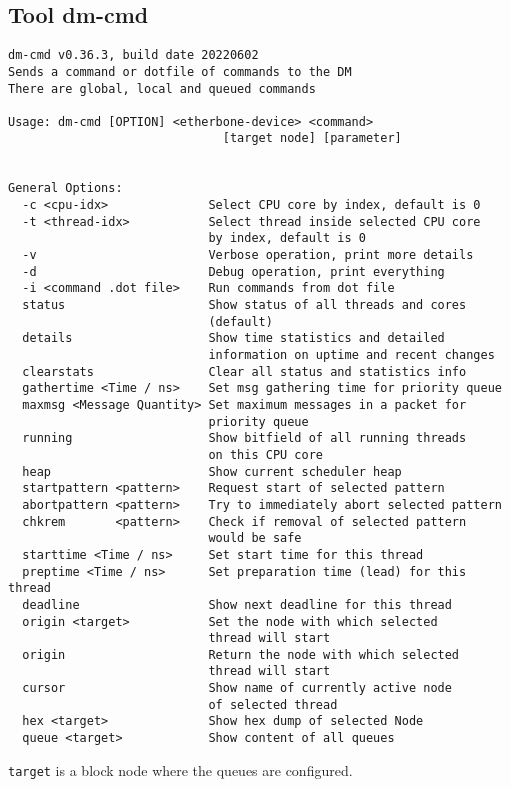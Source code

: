 \subsection{Tool dm-cmd}
\label{Tool_dm-cmd}
\begin{lstlisting}[style = helptext]
dm-cmd v0.36.3, build date 20220602
Sends a command or dotfile of commands to the DM
There are global, local and queued commands

Usage: dm-cmd [OPTION] <etherbone-device> <command>
                              [target node] [parameter]


General Options:
  -c <cpu-idx>              Select CPU core by index, default is 0
  -t <thread-idx>           Select thread inside selected CPU core
                            by index, default is 0
  -v                        Verbose operation, print more details
  -d                        Debug operation, print everything
  -i <command .dot file>    Run commands from dot file
  status                    Show status of all threads and cores
                            (default)
  details                   Show time statistics and detailed
                            information on uptime and recent changes
  clearstats                Clear all status and statistics info
  gathertime <Time / ns>    Set msg gathering time for priority queue
  maxmsg <Message Quantity> Set maximum messages in a packet for
                            priority queue
  running                   Show bitfield of all running threads
                            on this CPU core
  heap                      Show current scheduler heap
  startpattern <pattern>    Request start of selected pattern
  abortpattern <pattern>    Try to immediately abort selected pattern
  chkrem       <pattern>    Check if removal of selected pattern
                            would be safe
  starttime <Time / ns>     Set start time for this thread
  preptime <Time / ns>      Set preparation time (lead) for this thread
  deadline                  Show next deadline for this thread
  origin <target>           Set the node with which selected
                            thread will start
  origin                    Return the node with which selected
                            thread will start
  cursor                    Show name of currently active node
                            of selected thread
  hex <target>              Show hex dump of selected Node
  queue <target>            Show content of all queues
\end{lstlisting}
\texttt{target} is a block node where the queues are configured.
